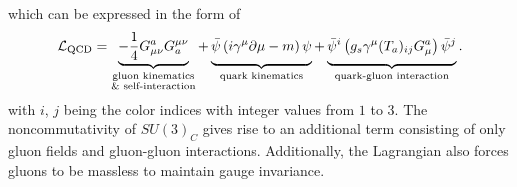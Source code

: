 \documentclass[../thesis.tex]{subfiles}
\begin{document}
which can be expressed in the form of
\begin{equation}
\mathcal{L}_\mathrm{QCD} = 
\underbrace{
-\frac{1}{4} G_{\mu \nu}^a G_a^{\mu \nu}
}_{\substack{\text{gluon kinematics}\\ \text{\& self-interaction}}}
+\underbrace{\vphantom{\frac{1}{4}}
\bar{\psi}\left( i\gamma^\mu \partial\mu-m \right)\psi
}_\text{quark kinematics}
+\underbrace{\vphantom{\frac{1}{4}}
\bar{\psi}^i\left( g_s \gamma^\mu (T_a)_{ij} G^a_\mu \right)\bar{\psi}^j
}_\text{quark-gluon interaction}.
\end{equation}
with $i$, $j$ being the color indices with integer values from $1$ to $3$. The noncommutativity of $SU(3)_C$ gives rise to an additional term consisting of only gluon fields and gluon-gluon interactions. Additionally, the Lagrangian also forces gluons to be massless to maintain gauge invariance.\\
\end{document}
